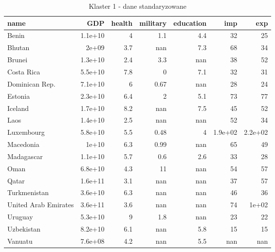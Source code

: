 \begin{table}
    \centering
    \caption{Klaster 1 - dane standaryzowane}
    \label{tab:cl1std}
    \begin{tabular}{lrrrrrr}
        \toprule
        name                 & GDP     & health & military & education & imp     & exp     \\
        \midrule
        Benin                & 1.1e+10 & 4      & 1.1      & 4.4       & 32      & 25      \\
        Bhutan               & 2e+09   & 3.7    & nan      & 7.3       & 68      & 34      \\
        Brunei               & 1.3e+10 & 2.4    & 3.3      & nan       & 38      & 52      \\
        Costa Rica           & 5.5e+10 & 7.8    & 0        & 7.1       & 32      & 31      \\
        Dominican Rep.       & 7.1e+10 & 6      & 0.67     & nan       & 28      & 24      \\
        Estonia              & 2.3e+10 & 6.4    & 2        & 5.1       & 73      & 77      \\
        Iceland              & 1.7e+10 & 8.2    & nan      & 7.5       & 45      & 52      \\
        Laos                 & 1.4e+10 & 2.5    & nan      & nan       & 52      & 34      \\
        Luxembourg           & 5.8e+10 & 5.5    & 0.48     & 4         & 1.9e+02 & 2.2e+02 \\
        Macedonia            & 1e+10   & 6.3    & 0.99     & nan       & 65      & 49      \\
        Madagascar           & 1.1e+10 & 5.7    & 0.6      & 2.6       & 33      & 28      \\
        Oman                 & 6.8e+10 & 4.3    & 11       & nan       & 54      & 57      \\
        Qatar                & 1.6e+11 & 3.1    & nan      & nan       & 37      & 57      \\
        Turkmenistan         & 3.6e+10 & 6.3    & nan      & nan       & 46      & 36      \\
        United Arab Emirates & 3.6e+11 & 3.6    & nan      & nan       & 74      & 1e+02   \\
        Uruguay              & 5.3e+10 & 9      & 1.8      & nan       & 23      & 22      \\
        Uzbekistan           & 8.2e+10 & 6.1    & nan      & 5.8       & 15      & 15      \\
        Vanuatu              & 7.6e+08 & 4.2    & nan      & 5.5       & nan     & nan     \\
        \bottomrule
    \end{tabular}
\end{table}
